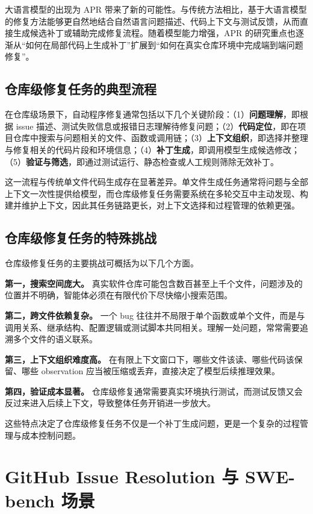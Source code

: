 大语言模型的出现为 APR 带来了新的可能性。与传统方法相比，基于大语言模型的修复方法能够更自然地结合自然语言问题描述、代码上下文与测试反馈，从而直接生成候选补丁或辅助完成修复流程。随着模型能力增强，APR 的研究重点也逐渐从“如何在局部代码上生成补丁”扩展到“如何在真实仓库环境中完成端到端问题修复”。

\subsection{仓库级修复任务的典型流程}

在仓库级场景下，自动程序修复通常包括以下几个关键阶段：（1）\textbf{问题理解}，即根据 issue 描述、测试失败信息或报错日志理解待修复问题；（2）\textbf{代码定位}，即在项目仓库中搜索与问题相关的文件、函数或调用链；（3）\textbf{上下文组织}，即选择并整理与修复相关的代码片段和环境信息；（4）\textbf{补丁生成}，即调用模型生成候选修改；（5）\textbf{验证与筛选}，即通过测试运行、静态检查或人工规则筛除无效补丁。

这一流程与传统单文件代码生成存在显著差异。单文件生成任务通常将问题与全部上下文一次性提供给模型，而仓库级修复任务需要系统在多轮交互中主动发现、构建并维护上下文，因此其任务链路更长，对上下文选择和过程管理的依赖更强。

\subsection{仓库级修复任务的特殊挑战}

仓库级修复任务的主要挑战可概括为以下几个方面。

\textbf{第一，搜索空间庞大。} 真实软件仓库可能包含数百甚至上千个文件，问题涉及的位置并不明确，智能体必须在有限代价下尽快缩小搜索范围。

\textbf{第二，跨文件依赖复杂。} 一个 bug 往往并不局限于单个函数或单个文件，而是与调用关系、继承结构、配置逻辑或测试脚本共同相关。理解一处问题，常常需要追溯多个文件的语义联系。

\textbf{第三，上下文组织难度高。} 在有限上下文窗口下，哪些文件该读、哪些代码该保留、哪些 observation 应当被压缩或丢弃，直接决定了模型后续推理效果。

\textbf{第四，验证成本显著。} 仓库级修复通常需要真实环境执行测试，而测试反馈又会反过来进入后续上下文，导致整体任务开销进一步放大。

这些特点决定了仓库级修复任务不仅是一个补丁生成问题，更是一个复杂的过程管理与成本控制问题。


\section{GitHub Issue Resolution 与 SWE-bench 场景}

